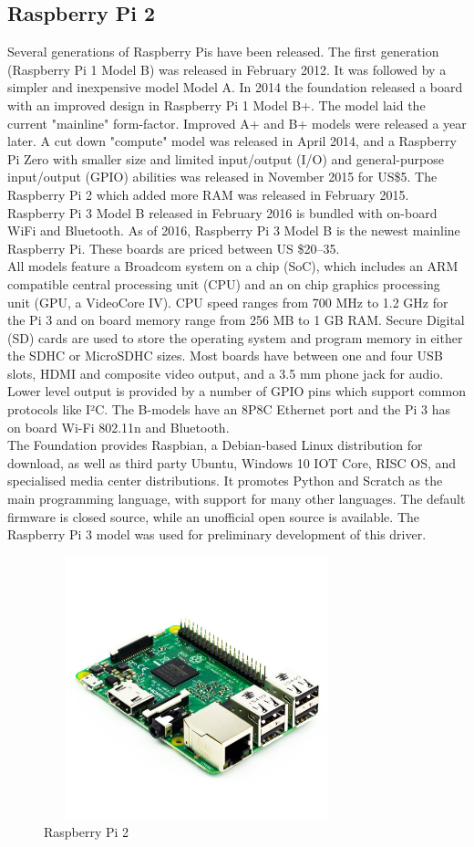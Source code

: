 \subsection{Raspberry Pi 2}
Several generations of Raspberry Pis have been released. The first generation (Raspberry Pi 1 Model B) was released in February 2012. It was followed by a simpler and inexpensive model Model A. In 2014 the foundation released a board with an improved design in Raspberry Pi 1 Model B+. The model laid the current "mainline" form-factor. Improved A+ and B+ models were released a year later. A cut down "compute" model was released in April 2014, and a Raspberry Pi Zero with smaller size and limited input/output (I/O) and general-purpose input/output (GPIO) abilities was released in November 2015 for US\$5. The Raspberry Pi 2 which added more RAM was released in February 2015. Raspberry Pi 3 Model B released in February 2016 is bundled with on-board WiFi and Bluetooth. As of 2016, Raspberry Pi 3 Model B is the newest mainline Raspberry Pi. These boards are priced between US \$20–35.\\
All models feature a Broadcom system on a chip (SoC), which includes an ARM compatible central processing unit (CPU) and an on chip graphics processing unit (GPU, a VideoCore IV). CPU speed ranges from 700 MHz to 1.2 GHz for the Pi 3 and on board memory range from 256 MB to 1 GB RAM. Secure Digital (SD) cards are used to store the operating system and program memory in either the SDHC or MicroSDHC sizes. Most boards have between one and four USB slots, HDMI and composite video output, and a 3.5 mm phone jack for audio. Lower level output is provided by a number of GPIO pins which support common protocols like I²C. The B-models have an 8P8C Ethernet port and the Pi 3 has on board Wi-Fi 802.11n and Bluetooth.\\
The Foundation provides Raspbian, a Debian-based Linux distribution for download, as well as third party Ubuntu, Windows 10 IOT Core, RISC OS, and specialised media center distributions. It promotes Python and Scratch as the main programming language, with support for many other languages. The default firmware is closed source, while an unofficial open source is available.
The Raspberry Pi 3 model was used for preliminary development of this driver.
\begin{figure}[H]
	\centering
	\includegraphics[width=3.5in, height=3in]{images/raspberry_pi.png}
	\caption{Raspberry Pi 2}
\end{figure}
